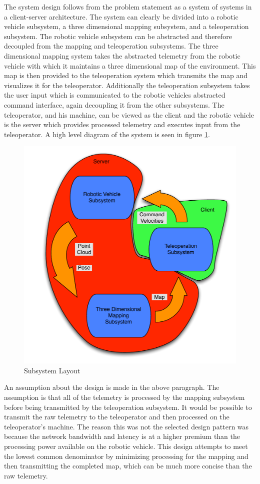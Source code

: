 \documentclass[12pt]{report}
\begin{document}
The system design follows from the problem statement as a system of systems in a client-server architecture.  The system can clearly be divided into a robotic vehicle subsystem, a three dimensional mapping subsystem, and a teleoperation subsystem.  The robotic vehicle subsystem can be abstracted and therefore decoupled from the mapping and teleoperation subsystems.  The three dimensional mapping system takes the abstracted telemetry from the robotic vehicle with which it maintains a three dimensional map of the environment.  This map is then provided to the teleoperation system which transmits the map and visualizes it for the teleoperator.  Additionally the teleoperation subsystem takes the user input which is communicated to the robotic vehicles abstracted command interface, again decoupling it from the other subsystems.  The teleoperator, and his machine, can be viewed as the client and the robotic vehicle is the server which provides processed telemetry and executes input from the teleoperator.  A high level diagram of the system is seen in figure \ref{fig:subsystem}.

\begin{figure}[ht]
  \centering
  \includegraphics[width=5in,keepaspectratio]{subsystem.pdf}
  \caption{Subsystem Layout}
  \label{fig:subsystem}
\end{figure}

An assumption about the design is made in the above paragraph.  The assumption is that all of the telemetry is processed by the mapping subsystem before being transmitted by the teleoperation subsystem.  It would be possible to transmit the raw telemetry to the teleoperator and then processed on the teleoperator's machine.  The reason this was not the selected design pattern was because the network bandwidth and latency is at a higher premium than the processing power available on the robotic vehicle.  This design attempts to meet the lowest common denominator by minimizing processing for the mapping and then transmitting the completed map, which can be much more concise than the raw telemetry.
\end{document}

